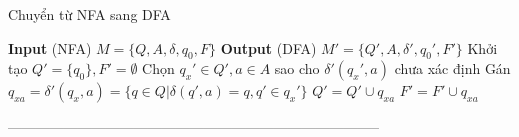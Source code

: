 \documentclass[12pt,a4paper]{article}
\begin{document}
\begin{algorithm}[H]
\caption{Chuyển từ NFA sang DFA}
\begin{algorithmic} 
\STATE \textbf{Input} (NFA) $M = \{Q, A, \delta, q_0, F\}$
\STATE \textbf{Output} (DFA) $M' = \{Q', A, \delta', q_0', F'\}$
\STATE Khởi tạo $Q' = \{q_0\}, F' = \emptyset$
\STATE Chọn $q_x' \in Q', a \in A$ sao cho $\delta'(q_x', a)$ chưa xác định
\STATE Gán $q_{xa} = \delta'(q_x, a) = \{q \in Q | \delta(q', a) = q, q' \in q_x'\}$
\STATE $Q' = Q' \cup q_{xa}$
\ENDIF
{}
\STATE $F' = F' \cup q_{xa}$
\ENDIF
\ENDWHILE
\end{algorithmic}
\end{algorithm}
--------------------------------------------------------------------------------\\
\end{document}
